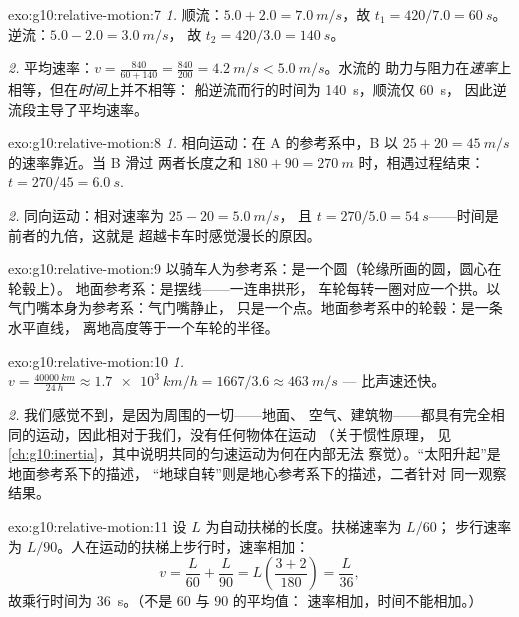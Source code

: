 \begin{solution}{exo:g10:relative-motion:7}
\emph{1.} 顺流：$5.0 + 2.0 = \qty{7.0}{m/s}$，故
$t_1 = 420/7.0 = \qty{60}{s}$。逆流：$5.0 - 2.0 = \qty{3.0}{m/s}$，
故 $t_2 = 420/3.0 = \qty{140}{s}$。

\emph{2.} 平均速率：$v = \frac{840}{60 + 140}
= \frac{840}{200} = \qty{4.2}{m/s} < \qty{5.0}{m/s}$。水流的
助力与阻力在\emph{速率}上相等，但在\emph{时间}上并不相等：
船逆流而行的时间为 \qty{140}{s}，顺流仅 \qty{60}{s}，
因此逆流段主导了平均速率。
\end{solution}

\begin{solution}{exo:g10:relative-motion:8}
\emph{1.} 相向运动：在 A 的参考系中，B 以
$25 + 20 = \qty{45}{m/s}$ 的速率靠近。当 B 滑过
两者长度之和 $180 + 90 = \qty{270}{m}$ 时，相遇过程结束：
$t = 270/45 = \qty{6.0}{s}$.

\emph{2.} 同向运动：相对速率为 $25 - 20 = \qty{5.0}{m/s}$，
且 $t = 270/5.0 = \qty{54}{s}$——时间是前者的九倍，这就是
超越卡车时感觉漫长的原因。
\end{solution}

\begin{solution}{exo:g10:relative-motion:9}
以骑车人为参考系：是一个圆（轮缘所画的圆，圆心在轮毂上）。
地面参考系：是摆线——一连串拱形，
车轮每转一圈对应一个拱。以气门嘴本身为参考系：气门嘴静止，
只是一个点。地面参考系中的轮毂：是一条水平直线，
离地高度等于一个车轮的半径。
\end{solution}

\begin{solution}{exo:g10:relative-motion:10}
\emph{1.} $v = \frac{\qty{40000}{km}}{\qty{24}{h}}
\approx \qty{1.7e3}{km/h} = 1667/3.6 \approx \qty{463}{m/s}$ ---
比声速还快。

\emph{2.} 我们感觉不到，是因为周围的一切——地面、
空气、建筑物——都具有完全相同的运动，因此相对于我们，没有任何物体在运动
（关于惯性原理，
见\cref{ch:g10:inertia}，其中说明共同的匀速运动为何在内部无法
察觉）。“太阳升起”是地面参考系下的描述，
“地球自转”则是地心参考系下的描述，二者针对
同一观察结果。
\end{solution}

\begin{solution}{exo:g10:relative-motion:11}
设 $L$ 为自动扶梯的长度。扶梯速率为 $L/60$；
步行速率为 $L/90$。人在运动的扶梯上步行时，速率相加：
\[
v = \frac{L}{60} + \frac{L}{90} = L\left(\frac{3 + 2}{180}\right)
= \frac{L}{36},
\]
故乘行时间为 \qty{36}{s}。（不是 $60$ 与 $90$ 的平均值：
速率相加，时间不能相加。）
\end{solution}

